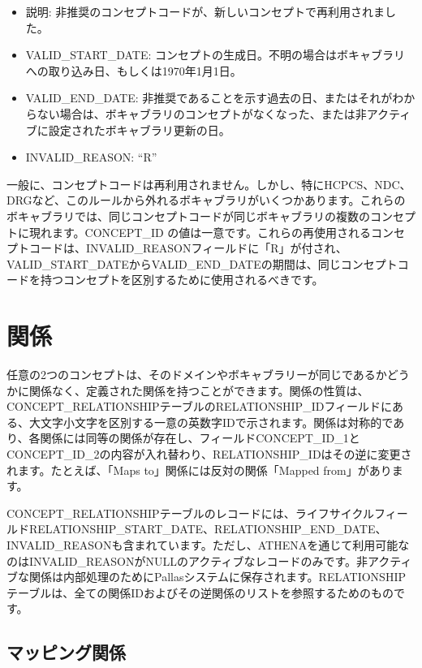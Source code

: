\documentclass[
  11pt]{book}
\providecommand{\tightlist}{%
  \setlength{\itemsep}{0pt}\setlength{\parskip}{0pt}}
\theoremstyle{definition}
\theoremstyle{definition}
\theoremstyle{definition}
\theoremstyle{definition}
\theoremstyle{remark}
\begin{document}
\begin{itemize}
  \begin{itemize}
  \tightlist
  \item
    説明: 非推奨のコンセプトコードが、新しいコンセプトで再利用されました。
  \item
    VALID\_START\_DATE: コンセプトの生成日。不明の場合はボキャブラリへの取り込み日、もしくは1970年1月1日。
  \item
    VALID\_END\_DATE: 非推奨であることを示す過去の日、またはそれがわからない場合は、ボキャブラリのコンセプトがなくなった、または非アクティブに設定されたボキャブラリ更新の日。
  \item
    INVALID\_REASON: ``R''
  \end{itemize}
\end{itemize}

一般に、コンセプトコードは再利用されません。しかし、特にHCPCS、NDC、DRGなど、このルールから外れるボキャブラリがいくつかあります。これらのボキャブラリでは、同じコンセプトコードが同じボキャブラリの複数のコンセプトに現れます。CONCEPT\_ID の値は一意です。これらの再使用されるコンセプトコードは、INVALID\_REASONフィールドに「R」が付され、VALID\_START\_DATEからVALID\_END\_DATEの期間は、同じコンセプトコードを持つコンセプトを区別するために使用されるべきです。

\section{関係}\label{ux95a2ux4fc2}

任意の2つのコンセプトは、そのドメインやボキャブラリーが同じであるかどうかに関係なく、定義された関係を持つことができます。関係の性質は、CONCEPT\_RELATIONSHIPテーブルのRELATIONSHIP\_IDフィールドにある、大文字小文字を区別する一意の英数字IDで示されます。関係は対称的であり、各関係には同等の関係が存在し、フィールドCONCEPT\_ID\_1とCONCEPT\_ID\_2の内容が入れ替わり、RELATIONSHIP\_IDはその逆に変更されます。たとえば、「Maps to」関係には反対の関係「Mapped from」があります。

CONCEPT\_RELATIONSHIPテーブルのレコードには、ライフサイクルフィールドRELATIONSHIP\_START\_DATE、RELATIONSHIP\_END\_DATE、INVALID\_REASONも含まれています。ただし、ATHENAを通じて利用可能なのはINVALID\_REASONがNULLのアクティブなレコードのみです。非アクティブな関係は内部処理のためにPallasシステムに保存されます。RELATIONSHIPテーブルは、全ての関係IDおよびその逆関係のリストを参照するためのものです。

\subsection{マッピング関係}\label{conceptMapping}
\end{document}

